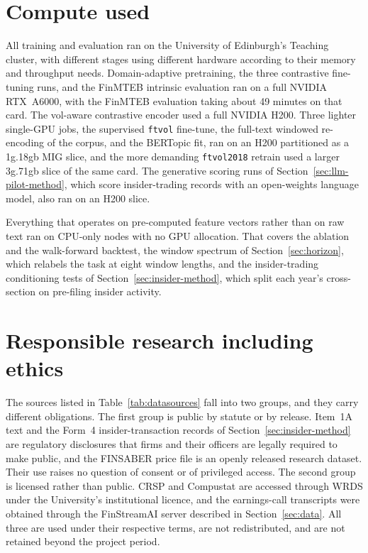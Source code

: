\documentclass[logo,msc,ai]{infthesis}        %
\begin{document}
\section{Compute used}
\label{sec:compute}
All training and evaluation ran on the University of Edinburgh's Teaching cluster, with different stages using different hardware according to their memory and throughput needs. Domain-adaptive pretraining, the three contrastive fine-tuning runs, and the FinMTEB intrinsic evaluation ran on a full NVIDIA RTX~A6000, with the FinMTEB evaluation taking about 49 minutes on that card. The vol-aware contrastive encoder used a full NVIDIA H200. Three lighter single-GPU jobs, the supervised \texttt{ftvol} fine-tune, the full-text windowed re-encoding of the corpus, and the BERTopic fit, ran on an H200 partitioned as a 1g.18gb MIG slice, and the more demanding \texttt{ftvol2018} retrain used a larger 3g.71gb slice of the same card. The generative scoring runs of Section~\ref{sec:llm-pilot-method}, which score insider-trading records with an open-weights language model, also ran on an H200 slice.

Everything that operates on pre-computed feature vectors rather than on raw text ran on CPU-only nodes with no GPU allocation. That covers the ablation and the walk-forward backtest, the window spectrum of Section~\ref{sec:horizon}, which relabels the task at eight window lengths, and the insider-trading conditioning tests of Section~\ref{sec:insider-method}, which split each year's cross-section on pre-filing insider activity.

\section{Responsible research including ethics}
The sources listed in Table~\ref{tab:datasources} fall into two groups, and they carry different obligations. The first group is public by statute or by release. Item~1A text and the Form~4 insider-transaction records of Section~\ref{sec:insider-method} are regulatory disclosures that firms and their officers are legally required to make public, and the FINSABER price file is an openly released research dataset. Their use raises no question of consent or of privileged access. The second group is licensed rather than public. CRSP and Compustat are accessed through WRDS under the University's institutional licence, and the earnings-call transcripts were obtained through the FinStreamAI server described in Section~\ref{sec:data}. All three are used under their respective terms, are not redistributed, and are not retained beyond the project period.
\end{document}
